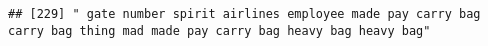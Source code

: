 \documentclass[
]{article}
\begin{document}
\begin{verbatim}
## [229] " gate number spirit airlines employee made pay carry bag carry bag thing mad made pay carry bag heavy bag heavy bag"                                                                                                                                                                                                                                                                                                                                                                                                                                                                                                                                                                                                                                                                                                                                                                                                                                                                                                                                                                                                                                                                                                                                                                                                                                                                                                                                                                                                                                                                                                                                                                                                                                                                           

\end{verbatim}
\end{document}
